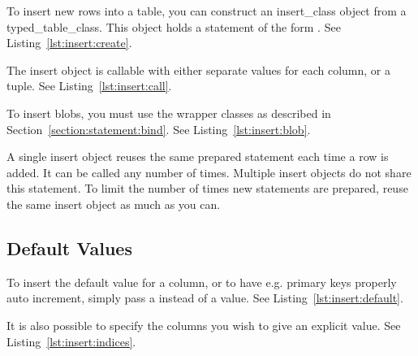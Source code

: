 To insert new rows into a table, you can construct an \gls{insert_class} object from a \gls{typed_table_class}. This object holds a statement of the form . See Listing~\ref{lst:insert:create}.



The insert object is callable with either separate values for each column, or a tuple. See Listing~\ref{lst:insert:call}.




To insert blobs, you must use the wrapper classes as described in Section~\ref{section:statement:bind}. See Listing~\ref{lst:insert:blob}.



A single insert object reuses the same prepared statement each time a row is added. It can be called any number of times. Multiple insert objects do not share this statement. To limit the number of times new statements are prepared, reuse the same insert object as much as you can.

\subsection{Default Values}

To insert the default value for a column, or to have e.g. primary keys properly auto increment, simply pass a  instead of a value. See Listing~\ref{lst:insert:default}.



It is also possible to specify the columns you wish to give an explicit value. See Listing~\ref{lst:insert:indices}.

